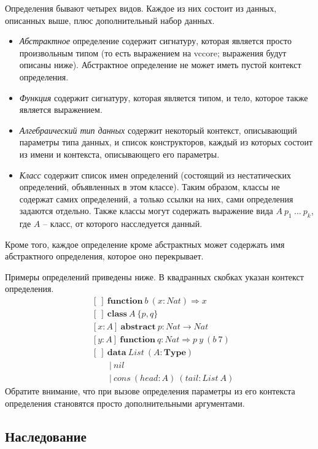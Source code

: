 \documentclass{amsart}
\theoremstyle{definition}
\theoremstyle{remark}
\numberwithin{figure}{section}
\begin{document}
Определения бывают четырех видов.
Каждое из них состоит из данных, описанных выше, плюс дополнительный набор данных.
\begin{itemize}
\item \emph{Абстрактное} определение содержит сигнатуру, которая является просто произвольным типом (то есть выражением на vccore; выражения будут описаны ниже). Абстрактное определение не может иметь пустой контекст определения.
\item \emph{Функция} содержит сигнатуру, которая является типом, и тело, которое также является выражением.
\item \emph{Алгебраический тип данных} содержит некоторый контекст, описывающий параметры типа данных, и список конструкторов, каждый из которых состоит из имени и контекста, описывающего его параметры.
\item \emph{Класс} содержит список имен определений (состоящий из нестатических определений, объявленных в этом классе).
    Таким образом, классы не содержат самих определений, а только ссылки на них, сами определения задаются отдельно.
    Также классы могут содержать выражение вида $A\ p_1\ \ldots\ p_k$, где $A$ -- класс, от которого насследуется данный.
\end{itemize}
Кроме того, каждое определение кроме абстрактных может содержать имя абстрактного определения, которое оно перекрывает.

Примеры определений приведены ниже. В квадранных скобках указан контекст определения.
\begin{align*}
& [\ ]\ \mathbf{function}\ b\ (x : Nat) \Rightarrow x \\
& [\ ]\ \mathbf{class}\ A\ \{ p, q \} \\
& [x : A]\ \mathbf{abstract}\ p : Nat \to Nat \\
& [y : A]\ \mathbf{function}\ q : Nat \Rightarrow p\ y\ (b\ 7) \\
& [\ ]\ \mathbf{data}\ List\ (A : \mathbf{Type}) \\
& \qquad |\ nil \\
& \qquad |\ cons\ (head : A)\ (tail : List\ A)
\end{align*}
Обратите внимание, что при вызове определения параметры из его контекста определения становятся просто дополнительными аргументами.

\subsection{Наследование}
\end{document}
